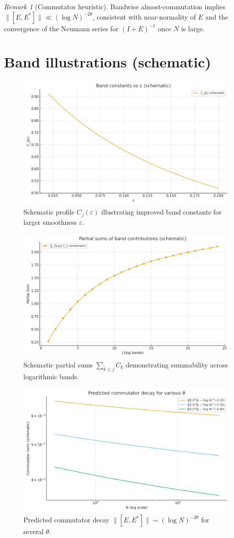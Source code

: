 \documentclass[11pt]{article}
\theoremstyle{remark}
\newtheorem{remark}{Remark}
\begin{document}
\begin{remark}[Commutator heuristic]
Bandwise almost-commutation implies $\|[E,E^\ast]\|\ll (\log N)^{-2\theta}$, consistent with near-normality of $E$ and the convergence of the Neumann series for $(I+E)^{-1}$ once $N$ is large.
\end{remark}

\section{Band illustrations (schematic)}
\begin{figure}[h]
\centering
\includegraphics[width=0.75\linewidth]{figures/band_constants_vs_eps.png}
\caption{Schematic profile $C_j(\varepsilon)$ illustrating improved band constants for larger smoothness $\varepsilon$.}
\end{figure}

\begin{figure}[h]
\centering
\includegraphics[width=0.75\linewidth]{figures/band_partial_sums.png}
\caption{Schematic partial sums $\sum_{k\le j} C_k$ demonstrating summability across logarithmic bands.}
\end{figure}

\begin{figure}[h]
\centering
\includegraphics[width=0.75\linewidth]{figures/commutator_decay_multi.png}
\caption{Predicted commutator decay $\|[E,E^\ast]\|\sim(\log N)^{-2\theta}$ for several $\theta$.}
\end{figure}
\end{document}
